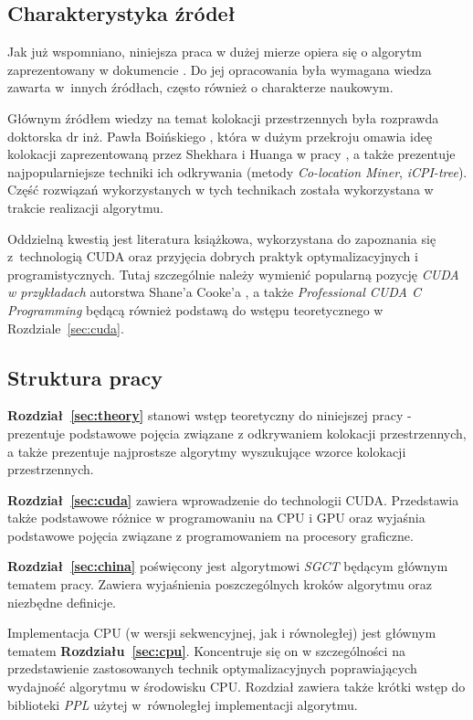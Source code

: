 \documentclass[12pt]{article}
\begin{document}
\subsection{Charakterystyka źródeł}

Jak już wspomniano, niniejsza praca w dużej mierze opiera się o algorytm zaprezentowany w dokumencie \cite{chinczyki}. Do jej opracowania była wymagana wiedza zawarta w~innych źródłach, często również o charakterze naukowym.

Głównym źródłem wiedzy na temat kolokacji przestrzennych była rozprawda doktorska dr inż. Pawła Boińskiego \cite{boinski}, która w dużym przekroju omawia ideę kolokacji zaprezentowaną przez Shekhara i Huanga w pracy \cite{huang}, a także prezentuje najpopularniejsze techniki ich odkrywania (metody \textit{Co-location Miner}, \textit{iCPI-tree}). Część rozwiązań wykorzystanych w tych technikach została wykorzystana w trakcie realizacji algorytmu.

Oddzielną kwestią jest literatura książkowa, wykorzystana do zapoznania się z~technologią CUDA oraz przyjęcia dobrych praktyk optymalizacyjnych i programistycznych. Tutaj szczególnie należy wymienić popularną pozycję \textit{CUDA w przykładach} autorstwa Shane'a Cooke'a \cite{cuda_by_examples}, a także \textit{Professional CUDA C Programming} \cite{professional_cuda} będącą również podstawą do wstępu teoretycznego w Rozdziale~\ref{sec:cuda}.

\subsection{Struktura pracy}

\textbf{Rozdział~\ref{sec:theory}} stanowi wstęp teoretyczny do niniejszej pracy - prezentuje podstawowe pojęcia związane z odkrywaniem kolokacji przestrzennych, a także prezentuje najprostsze algorytmy wyszukujące wzorce kolokacji przestrzennych.

\textbf{Rozdział~\ref{sec:cuda}} zawiera wprowadzenie do technologii CUDA. Przedstawia także podstawowe różnice w programowaniu na CPU i GPU oraz wyjaśnia podstawowe pojęcia związane z programowaniem na procesory graficzne.

\textbf{Rozdział~\ref{sec:china}} poświęcony jest algorytmowi \textit{SGCT} będącym głównym tematem pracy. Zawiera wyjaśnienia poszczególnych kroków algorytmu oraz niezbędne definicje.

Implementacja CPU (w wersji sekwencyjnej, jak i równoległej) jest głównym tematem \textbf{Rozdziału~\ref{sec:cpu}}. Koncentruje się on w szczególności na przedstawienie zastosowanych technik optymalizacyjnych poprawiających wydajność algorytmu w środowisku CPU. Rozdział zawiera także krótki wstęp do biblioteki \textit{PPL} użytej w~równoległej implementacji algorytmu.
\end{document}
